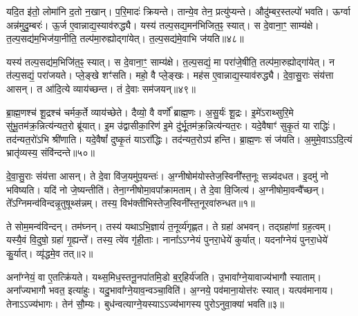 यदि॒त इ॑तो॒ लोमा॑नि द॒तो न॒खान्।
प॒रि॒मादः॑ क्रियन्ते।
तान्ये॒व तेन॒ प्रत्यु॑प्यन्ते।
औदु॑म्बर॒स्तल्पो॑ भवति।
ऊर्ग्वा अन्न॑मुदु॒म्बरः॑।
ऊ॒र्ज ए॒वान्नाद्य॒स्याव॑रुद्ध्यै।
यस्य॑ तल्प॒सद्य॒मन॑भिजित॒ꣴ॒ स्यात्।
स दे॒वाना॒ꣳ॒ साम्य॑क्षे।
त॒ल्प॒सद्य॑म॒भिज॑या॒नीति॒ तल्प॑मा॒रुह्योद्गा॑येत्।
त॒ल्प॒सद्य॑मे॒वाभि ज॑यति॥४८॥

यस्य॑ तल्प॒सद्य॑म॒भिजि॑त॒ꣴ॒ स्यात्।
स दे॒वाना॒ꣳ॒ साम्य॑क्षे।
त॒ल्प॒सद्यं॒ मा परा॑जे॒षीति॒ तल्प॑मा॒रुह्योद्गा॑येत्।
न त॑ल्प॒सद्यं॒ परा॑जयते।
प्ले॒ङ्खे शꣳ॑सति।
महो॒ वै प्ले॒ङ्खः।
मह॑स ए॒वान्नाद्य॒स्याव॑रुद्ध्यै।
दे॒वा॒सु॒राः संय॑त्ता आसन्।
त आ॑दि॒त्ये व्याय॑च्छन्त।
तं दे॒वाः सम॑जयन्॥४९॥

ब्रा॒ह्म॒णश्च॑ शू॒द्रश्च॑ चर्मक॒र्ते व्याय॑च्छेते।
दैव्यो॒ वै वर्णो᳚ ब्राह्म॒णः।
अ॒सु॒र्यः॑ शू॒द्रः।
इ॒मे॑\-ऽराथ्सुरि॒मे सु॑भू॒तम॑क्र॒न्नित्य॑न्यत॒रो ब्रू॑यात्।
इ॒म उ॑द्वासीका॒रिण॑ इ॒मे दु॑र्भू॒तम॑क्र॒न्नित्य॑न्यत॒रः।
यदे॒वैषाꣳ॑ सुकृ॒तं या राद्धिः॑।
तद॑न्यत॒रो॑ऽभि श्री॑णाति।
यदे॒वैषां᳚ दुष्कृ॒तं याऽरा᳚द्धिः।
तद॑न्यत॒रोऽप॑ हन्ति।
ब्रा॒ह्म॒णः सं ज॑यति।
अ॒मुमे॒वाऽऽदि॒त्यं भ्रातृ॑व्यस्य॒ संवि॑न्दन्ते॥५०॥




\clearpage
{}
\setcounter{anuvakam}{0}

दे॒वा॒सु॒राः संय॑त्ता आसन्।
ते दे॒वा वि॑ज॒यमु॑प॒यन्तः॑।
अ॒ग्नीषोम॑योस्तेज॒स्विनी᳚स्त॒नूः सन्न्य॑दधत।
इ॒दमु॑ नो भविष्यति।
यदि॑ नो जे॒ष्यन्तीति॑।
तेना॒ग्नीषोमा॒वपा᳚क्रामताम्।
ते दे॒वा वि॒जित्य॑।
अ॒ग्नीषोमा॒वन्वै᳚च्छन्।
ते᳚ऽग्निमन्व॑\-विन्दन्नृ॒तुषूथ्स॑न्नम्।
तस्य॒ विभ॑क्तीभिस्तेज॒स्विनी᳚स्त॒नू\-रवा॑रुन्धत॥१॥

ते सोम॒मन्व॑विन्दन्।
तम॑घ्नन्।
तस्य॑ यथा\-ऽभि॒ज्ञायं॑ त॒नूर्व्य॑गृह्णत।
ते ग्रहा॑ अभवन्।
तद्ग्रहा॑णां ग्रह॒त्वम्।
यस्यै॒वं वि॒दुषो॒ ग्रहा॑ गृ॒ह्यन्ते᳚।
तस्य॒ त्वे॑व गृ॑ही॒ताः।
नाना᳚\-ऽऽग्नेयं पुनरा॒धेये॑ कुर्यात्।
यदना᳚ग्नेयं पुनरा॒धेये॑ कु॒र्यात्।
व्यृ॑द्धमे॒व तत्॥२॥

अना᳚ग्नेयं॒ वा ए॒तत्क्रि॑यते।
यथ्स॒मिध॒स्तनू॒नपा॑तमि॒डो ब॒र्॒\mbox{}हिर्य॑जति।
उ॒भावा᳚ग्ने॒यावाज्य॑भागौ स्याताम्।
अना᳚ज्यभागौ भवत॒ इत्या॑हुः।
यदु॒भावा᳚ग्ने॒याव॒न्वञ्चा॒विति॑।
अ॒ग्नये॒ पव॑माना॒योत्त॑रः स्यात्।
यत्पव॑मानाय।
तेनाऽऽज्य॑भागः।
तेन॑ सौ॒म्यः।
बुध॑न्वत्याग्ने॒यस्याऽऽज्य॑भागस्य पुरो\-ऽनुवा॒क्या॑ भवति॥३॥

